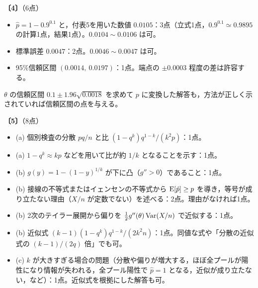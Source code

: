 \documentclass[a4paper,11pt]{ltjsarticle}
\renewcommand{\ans}[1]{\par\medskip\noindent\textbf{〔#1〕}\quad}
\renewcommand{\points}[1]{\hfill\textnormal{（#1点）}\par\nobreak}
\begin{document}
\ans{4}\points{6}
\begin{itemize}
\item $\hat p=1-0.9^{0.1}$ と，付表5を用いた数値 $0.0105$：3点（立式1点，$0.9^{0.1}\simeq0.9895$ の計算1点，結果1点）。$0.0104\sim0.0106$ は可。
\item 標準誤差 $0.0047$：2点。$0.0046\sim0.0047$ は可。
\item 95\%信頼区間 $(0.0014,\ 0.0197)$：1点。端点の $\pm0.0003$ 程度の差は許容する。
\end{itemize}
$\theta$ の信頼区間 $0.1\pm1.96\sqrt{0.0018}$ を求めて $p$ に変換した解答も，方法が正しく示されていれば信頼区間の点を与える。

\ans{5}\points{8}
\begin{itemize}
\item (a) 個別検査の分散 $pq/n$ と比 $(1-q^k)q^{1-k}/(k^2p)$：1点。
\item (a) $1-q^k\approx kp$ などを用いて比が約 $1/k$ となることを示す：1点。
\item (b) $g(y)=1-(1-y)^{1/k}$ が下に凸（$g''>0$）であること：1点。
\item (b) 接線の不等式またはイェンセンの不等式から $\operatorname{E}[\hat p]\ge p$ を導き，等号が成り立たない理由（$X/n$ が定数でない）を述べる：2点。理由がなければ1点。
\item (b) 2次のテイラー展開から偏りを $\frac12g''(\theta)\operatorname{Var}(X/n)$ で近似する：1点。
\item (b) 近似式 $(k-1)(1-q^k)q^{1-k}/(2k^2n)$：1点。同値な式や「分散の近似式の $(k-1)/(2q)$ 倍」でも可。
\item (c) $k$ が大きすぎる場合の問題（分散や偏りが増大する，ほぼ全プールが陽性になり情報が失われる，全プール陽性で $\hat p=1$ となる，近似が成り立たない，など）：1点。近似式を根拠にした解答も可。
\end{itemize}
\end{document}
